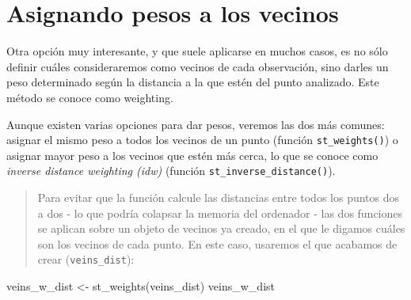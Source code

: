 \documentclass[
  letterpaper,
  DIV=11,
  numbers=noendperiod]{scrreprt}
\newenvironment{Shaded}{\begin{snugshade}}{\end{snugshade}}
\newcommand{\FunctionTok}[1]{\textcolor[rgb]{0.28,0.35,0.67}{#1}}
\newcommand{\NormalTok}[1]{\textcolor[rgb]{0.00,0.23,0.31}{#1}}
\newcommand{\OtherTok}[1]{\textcolor[rgb]{0.00,0.23,0.31}{#1}}
\begin{document}
\hypertarget{asignando-pesos-a-los-vecinos}{%
\section{Asignando pesos a los
vecinos}\label{asignando-pesos-a-los-vecinos}}

Otra opción muy interesante, y que suele aplicarse en muchos casos, es
no sólo definir cuáles consideraremos como vecinos de cada observación,
sino darles un peso determinado según la distancia a la que estén del
punto analizado. Este método se conoce como weighting.

Aunque existen varias opciones para dar pesos, veremos las dos más
comunes: asignar el mismo peso a todos los vecinos de un punto (función
\texttt{st\_weights()}) o asignar mayor peso a los vecinos que estén más
cerca, lo que se conoce como \emph{inverse distance weighting (idw)}
(función \texttt{st\_inverse\_distance()}).

\begin{quote}
Para evitar que la función calcule las distancias entre todos los puntos
dos a dos - lo que podría colapsar la memoria del ordenador - las dos
funciones se aplican sobre un objeto de vecinos ya creado, en el que le
digamos cuáles son los vecinos de cada punto. En este caso, usaremos el
que acabamos de crear (\texttt{veins\_dist}):
\end{quote}

\begin{Shaded}
\begin{Highlighting}[]
\NormalTok{veins\_w\_dist }\OtherTok{\textless{}{-}} \FunctionTok{st\_weights}\NormalTok{(veins\_dist)}
\NormalTok{veins\_w\_dist}
\end{Highlighting}
\end{Shaded}
\end{document}
